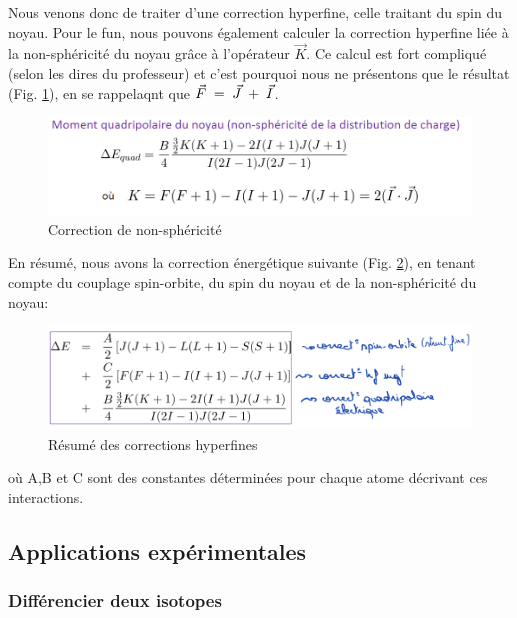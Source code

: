 Nous venons donc de traiter d'une correction hyperfine, celle traitant du spin du noyau. Pour le fun, nous pouvons également calculer la correction hyperfine liée à la non-sphéricité du noyau grâce à l'opérateur $\vec{K}$. Ce calcul est fort compliqué (selon les dires du professeur) et c'est pourquoi nous ne présentons que le résultat (Fig. \ref{fig:eq_correcK}), en se rappelaqnt que $\vec{F} \; = \; \vec{J} \; + \; \vec{I}$.
\begin{figure}[htp]
    \centering
    \includegraphics[scale=0.80]{Images2/CorrecK.PNG}
    \caption{Correction de non-sphéricité}
    \label{fig:eq_correcK}
\end{figure}
En résumé, nous avons la correction énergétique suivante (Fig. \ref{fig:eq_resume_correct}), en tenant compte du couplage spin-orbite, du spin du noyau et de la non-sphéricité du noyau:
\begin{figure}[htp]
    \centering
    \includegraphics[scale=0.80]{Images2/résuméCorrec.PNG}
    \caption{Résumé des corrections hyperfines}
    \label{fig:eq_resume_correct}
\end{figure}
où A,B et C sont des constantes déterminées pour chaque atome décrivant ces interactions.


\newpage
\subsection{Applications expérimentales}
\subsubsection{Différencier deux isotopes}



